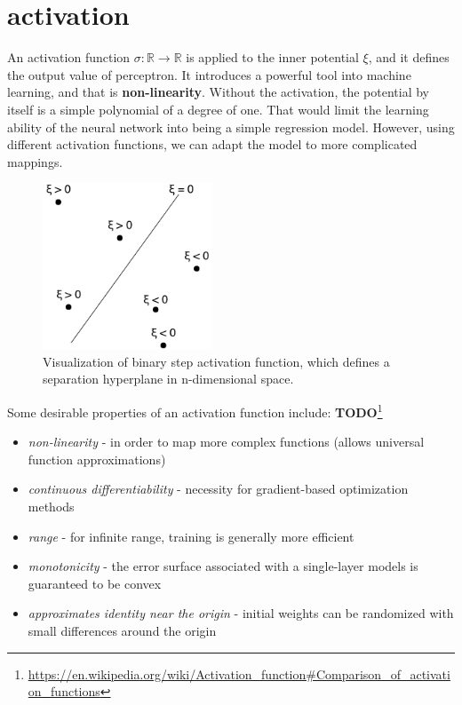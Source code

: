 \section{activation}

An activation function $\sigma: \mathbb{R} \rightarrow \mathbb{R}$ is applied to the inner potential $\xi$, and it defines the output value of perceptron. It introduces a powerful tool into machine learning, and that is \textbf{non-linearity}. Without the activation, the potential by itself is a simple polynomial of a degree of one. That would limit the learning ability of the neural network into being a simple regression model. However, using different activation functions, we can adapt the model to more complicated mappings.

\begin{figure}[h]

\centering
\includegraphics[width=0.45\textwidth]{tex/images/activation-vis}
\caption{Visualization of binary step activation function, which defines a separation hyperplane in n-dimensional space.}
\end{figure}

\noindent
Some desirable properties of an activation function include: \textbf{TODO}\footnote{\url{https://en.wikipedia.org/wiki/Activation_function\#Comparison_of_activation_functions}}

\begin{itemize}

\item \textit{non-linearity} - in order to map more complex functions (allows universal function approximations)
\item \textit{continuous differentiability} - necessity for gradient-based optimization methods
\item \textit{range} - for infinite range, training is generally more efficient
\item \textit{monotonicity} - the error surface associated with a single-layer models is guaranteed to be convex
\item \textit{approximates identity near the origin} - initial weights can be randomized with small differences around the origin

\end{itemize}

